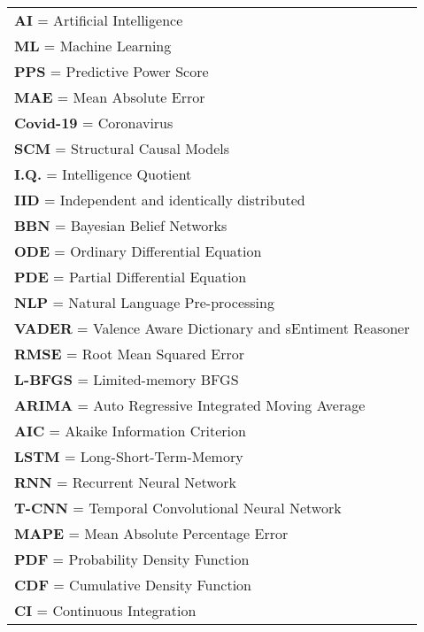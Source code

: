 \newpage
{}

\begin{Listofabbreviations}
\vspace*{10pt}

\begin{center}
    \begin{tabular}{@{}l@{}}
    \textbf{AI} = Artificial Intelligence \\
    \textbf{ML} = Machine Learning \\
    \textbf{PPS} = Predictive Power Score \\
    \textbf{MAE} = Mean Absolute Error \\
    \textbf{Covid-19} = Coronavirus \\
    \textbf{SCM} = Structural Causal Models \\
    \textbf{I.Q.} = Intelligence Quotient \\
    \textbf{IID} = Independent and identically distributed \\
    \textbf{BBN} = Bayesian Belief Networks \\
    \textbf{ODE} = Ordinary Differential Equation \\
    \textbf{PDE} = Partial Differential Equation \\
    \textbf{NLP} = Natural Language Pre-processing \\
    \textbf{VADER} = Valence Aware Dictionary and sEntiment Reasoner \\
    \textbf{RMSE} = Root Mean Squared Error \\ 
    \textbf{L-BFGS} = Limited-memory BFGS \\ 
    \textbf{ARIMA} = Auto Regressive Integrated Moving Average \\
    \textbf{AIC} = Akaike Information Criterion \\
    \textbf{LSTM} = Long-Short-Term-Memory \\
    \textbf{RNN} = Recurrent Neural Network \\
    \textbf{T-CNN} = Temporal Convolutional Neural Network \\
    \textbf{MAPE} = Mean Absolute Percentage Error \\
    \textbf{PDF} = Probability Density Function \\
    \textbf{CDF} = Cumulative Density Function \\
    \textbf{CI} = Continuous Integration \\
    \end{tabular}
\end{center}

\end{Listofabbreviations}